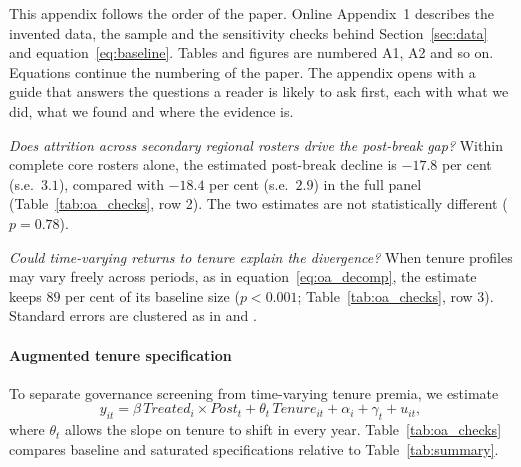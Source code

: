 This appendix follows the order of the paper. Online Appendix~1 describes the invented data, the sample and the sensitivity checks behind Section~\ref{sec:data} and equation~\eqref{eq:baseline}. Tables and figures are numbered A1, A2 and so on. Equations continue the numbering of the paper. The appendix opens with a guide that answers the questions a reader is likely to ask first, each with what we did, what we found and where the evidence is.

\begin{ecofinreaderqa}
\textit{Does attrition across secondary regional rosters drive the post-break gap?} Within complete core rosters alone, the estimated post-break decline is \(-17.8\) per cent (s.e.\ \(3.1\)), compared with \(-18.4\) per cent (s.e.\ \(2.9\)) in the full panel (Table~\ref{tab:oa_checks}, row 2). The two estimates are not statistically different (\(p = 0.78\)).

\textit{Could time-varying returns to tenure explain the divergence?} When tenure profiles may vary freely across periods, as in equation~\eqref{eq:oa_decomp}, the estimate keeps \(89\) per cent of its baseline size (\(p < 0.001\); Table~\ref{tab:oa_checks}, row 3). Standard errors are clustered as in \citet{bertrand2004} and \citet{abadie2023}.
\end{ecofinreaderqa}


\paragraph{Augmented tenure specification}
To separate governance screening from time-varying tenure premia, we estimate
\begin{equation}
  y_{it} = \beta \, \mathit{Treated}_{i} \times \mathit{Post}_{t} + \theta_{t} \, \mathit{Tenure}_{it} + \alpha_{i} + \gamma_{t} + u_{it},
  \label{eq:oa_decomp}
\end{equation}
where \(\theta_{t}\) allows the slope on tenure to shift in every year. Table~\ref{tab:oa_checks} compares baseline and saturated specifications relative to Table~\ref{tab:summary}.


